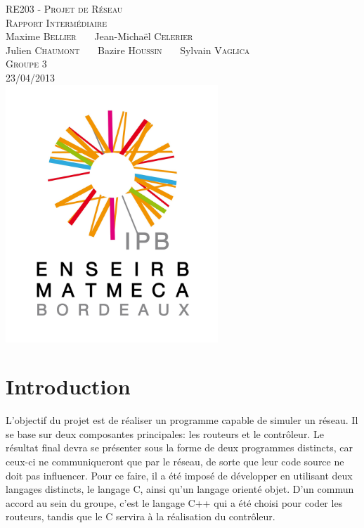\documentclass[a4paper,11pt]{article}
\begin{document}
\begin{titlepage}
  \begin{center}

    \textsc{\LARGE RE203 - Projet de Réseau}\\[2cm]
    \textsc{\large Rapport Intermédiaire}\\[3cm]
    Maxime \textsc{Bellier} \ \ \ Jean-Michaël \textsc{Celerier}\\
    Julien \textsc{Chaumont} \ \ \ Bazire \textsc{Houssin} \ \ \ Sylvain \textsc{Vaglica}\\[1cm]
    \textsc{Groupe 3}\\[1.5cm]
    \textsc{\large 23/04/2013 }\\[1.5cm]
    \includegraphics[width=8cm]{logo.png}

  \end{center}
  \vspace{3cm}

\end{titlepage}

\clearpage

\section*{Introduction}

L'objectif du projet est de réaliser un programme capable de simuler un réseau. Il se base sur deux composantes principales: les routeurs et le contrôleur. Le résultat final devra se présenter sous la forme de deux programmes distincts, car ceux-ci ne communiqueront que par le réseau, de sorte que leur code source ne doit pas influencer. Pour ce faire, il a été imposé de développer en utilisant deux langages distincts, le langage C, ainsi qu'un langage orienté objet. D'un commun accord au sein du groupe, c'est le langage C++ qui a été choisi pour coder les routeurs, tandis que le C servira à la réalisation du contrôleur.
\end{document}

